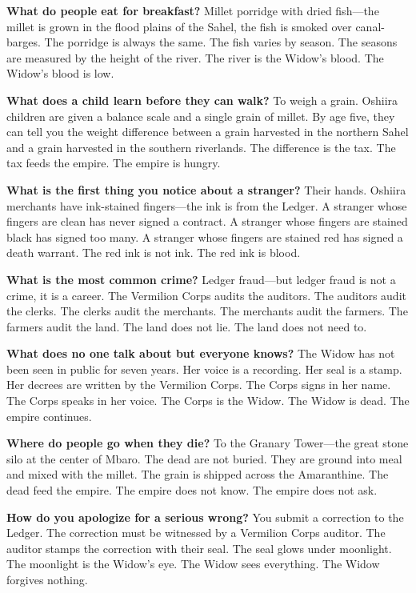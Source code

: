 \begin{almanac}
\textbf{What do people eat for breakfast?} Millet porridge with dried fish---the millet is grown in the flood plains of the Sahel, the fish is smoked over canal-barges. The porridge is always the same. The fish varies by season. The seasons are measured by the height of the river. The river is the Widow's blood. The Widow's blood is low.

\textbf{What does a child learn before they can walk?} To weigh a grain. Oshiira children are given a balance scale and a single grain of millet. By age five, they can tell you the weight difference between a grain harvested in the northern Sahel and a grain harvested in the southern riverlands. The difference is the tax. The tax feeds the empire. The empire is hungry.

\textbf{What is the first thing you notice about a stranger?} Their hands. Oshiira merchants have ink-stained fingers---the ink is from the Ledger. A stranger whose fingers are clean has never signed a contract. A stranger whose fingers are stained black has signed too many. A stranger whose fingers are stained red has signed a death warrant. The red ink is not ink. The red ink is blood.

\textbf{What is the most common crime?} Ledger fraud---but ledger fraud is not a crime, it is a career. The Vermilion Corps audits the auditors. The auditors audit the clerks. The clerks audit the merchants. The merchants audit the farmers. The farmers audit the land. The land does not lie. The land does not need to.

\textbf{What does no one talk about but everyone knows?} The Widow has not been seen in public for seven years. Her voice is a recording. Her seal is a stamp. Her decrees are written by the Vermilion Corps. The Corps signs in her name. The Corps speaks in her voice. The Corps is the Widow. The Widow is dead. The empire continues.

\textbf{Where do people go when they die?} To the Granary Tower---the great stone silo at the center of Mbaro. The dead are not buried. They are ground into meal and mixed with the millet. The grain is shipped across the Amaranthine. The dead feed the empire. The empire does not know. The empire does not ask.

\textbf{How do you apologize for a serious wrong?} You submit a correction to the Ledger. The correction must be witnessed by a Vermilion Corps auditor. The auditor stamps the correction with their seal. The seal glows under moonlight. The moonlight is the Widow's eye. The Widow sees everything. The Widow forgives nothing.


\end{almanac}
